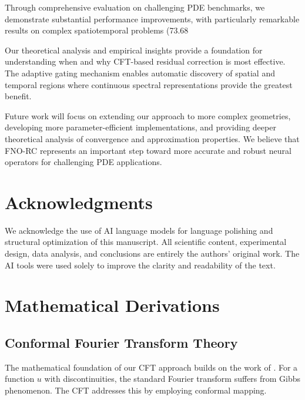 \documentclass[11pt]{article}
\begin{document}
{{{Through comprehensive evaluation on challenging PDE benchmarks, we demonstrate substantial performance improvements, with particularly remarkable results on complex spatiotemporal problems (73.68%

Our theoretical analysis and empirical insights provide a foundation for understanding when and why CFT-based residual correction is most effective. The adaptive gating mechanism enables automatic discovery of spatial and temporal regions where continuous spectral representations provide the greatest benefit.

Future work will focus on extending our approach to more complex geometries, developing more parameter-efficient implementations, and providing deeper theoretical analysis of convergence and approximation properties. We believe that FNO-RC represents an important step toward more accurate and robust neural operators for challenging PDE applications.

\section*{Acknowledgments}

We acknowledge the use of AI language models for language polishing and structural optimization of this manuscript. All scientific content, experimental design, data analysis, and conclusions are entirely the authors' original work. The AI tools were used solely to improve the clarity and readability of the text.




\appendix

\section{Mathematical Derivations}

\subsection{Conformal Fourier Transform Theory}

The mathematical foundation of our CFT approach builds on the work of \citet{barnett2010conformal}. For a function $u$ with discontinuities, the standard Fourier transform suffers from Gibbs phenomenon. The CFT addresses this by employing conformal mapping.

}}}
\end{document}
